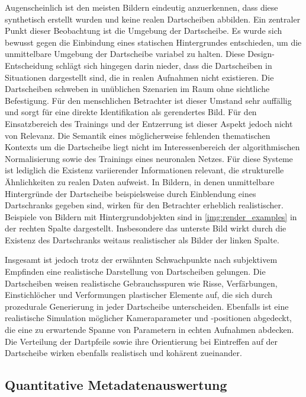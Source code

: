 Augenscheinlich ist den meisten Bildern eindeutig anzuerkennen, dass diese synthetisch erstellt wurden und keine realen Dartscheiben abbilden. Ein zentraler Punkt dieser Beobachtung ist die Umgebung der Dartscheibe. Es wurde sich bewusst gegen die Einbindung eines statischen Hintergrundes entschieden, um die unmittelbare Umgebung der Dartscheibe variabel zu halten. Diese Design-Entscheidung schlägt sich hingegen darin nieder, dass die Dartscheiben in Situationen dargestellt sind, die in realen Aufnahmen nicht existieren. Die Dartscheiben schweben in unüblichen Szenarien im Raum ohne sichtliche Befestigung. Für den menschlichen Betrachter ist dieser Umstand sehr auffällig und sorgt für eine direkte Identifikation als gerendertes Bild. Für den Einsatzbereich des Trainings und der Entzerrung ist dieser Aspekt jedoch nicht von Relevanz. Die Semantik eines möglicherweise fehlenden thematischen Kontexts um die Dartscheibe liegt nicht im Interessenbereich der algorithmischen Normalisierung sowie des Trainings eines neuronalen Netzes. Für diese Systeme ist lediglich die Existenz variierender Informationen relevant, die strukturelle Ähnlichkeiten zu realen Daten aufweist. In Bildern, in denen unmittelbare Hintergründe der Dartscheibe beispielsweise durch Einblendung eines Dartschranks gegeben sind, wirken für den Betrachter erheblich realistischer. Beispiele von Bildern mit Hintergrundobjekten sind in \autoref{img:render_examples} in der rechten Spalte dargestellt. Insbesondere das unterste Bild wirkt durch die Existenz des Dartschranks weitaus realistischer als Bilder der linken Spalte.

Insgesamt ist jedoch trotz der erwähnten Schwachpunkte nach subjektivem Empfinden eine realistische Darstellung von Dartscheiben gelungen. Die Dartscheiben weisen realistische Gebrauchsspuren wie Risse, Verfärbungen, Einstichlöcher und Verformungen plastischer Elemente auf, die sich durch prozedurale Generierung in jeder Dartscheibe unterscheiden. Ebenfalls ist eine realistische Simulation möglicher Kameraparameter und -positionen abgedeckt, die eine zu erwartende Spanne von Parametern in echten Aufnahmen abdecken. Die Verteilung der Dartpfeile sowie ihre Orientierung bei Eintreffen auf der Dartscheibe wirken ebenfalls realistisch und kohärent zueinander.


\subsection{Quantitative Metadatenauswertung} %
\label{sec:metadaten}

